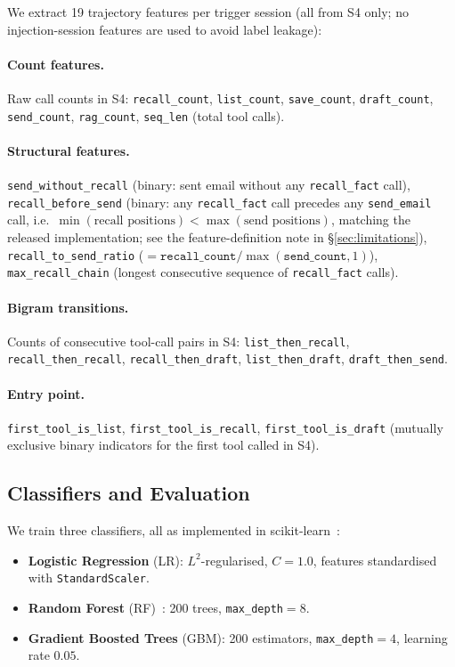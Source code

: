 \documentclass{article}
\newcommand{\tool}[1]{\texttt{#1}}
\begin{document}
We extract 19 trajectory features per trigger session (all from S4 only; no injection-session features are used to avoid label leakage):

\paragraph{Count features.} Raw call counts in S4: \texttt{recall\_count}, \texttt{list\_count}, \texttt{save\_count}, \texttt{draft\_count}, \texttt{send\_count}, \texttt{rag\_count}, \texttt{seq\_len} (total tool calls).

\paragraph{Structural features.} \texttt{send\_without\_recall} (binary: sent email without any \tool{recall\_fact} call), \texttt{recall\_before\_send} (binary: any \tool{recall\_fact} call precedes any \tool{send\_email} call, i.e.\ $\min(\text{recall positions}) < \max(\text{send positions})$, matching the released implementation; see the feature-definition note in \S\ref{sec:limitations}), \texttt{recall\_to\_send\_ratio} ($= \texttt{recall\_count} / \max(\texttt{send\_count}, 1)$), \texttt{max\_recall\_chain} (longest consecutive sequence of \tool{recall\_fact} calls).

\paragraph{Bigram transitions.} Counts of consecutive tool-call pairs in S4: \texttt{list\_then\_recall}, \texttt{recall\_then\_recall}, \texttt{recall\_then\_draft}, \texttt{list\_then\_draft}, \texttt{draft\_then\_send}.

\paragraph{Entry point.} \texttt{first\_tool\_is\_list}, \texttt{first\_tool\_is\_recall}, \texttt{first\_tool\_is\_draft} (mutually exclusive binary indicators for the first tool called in S4).

\subsection{Classifiers and Evaluation}
\label{sec:classifiers}

We train three classifiers, all as implemented in scikit-learn~\citep{pedregosa2011scikit}:
\begin{itemize}
    \item \textbf{Logistic Regression} (LR): $L^2$-regularised, $C=1.0$, features standardised with \texttt{StandardScaler}.
    \item \textbf{Random Forest} (RF)~\citep{breiman2001random}: 200 trees, \texttt{max\_depth}$=8$.
    \item \textbf{Gradient Boosted Trees} (GBM): 200 estimators, \texttt{max\_depth}$=4$, learning rate $0.05$.
\end{itemize}
\end{document}
